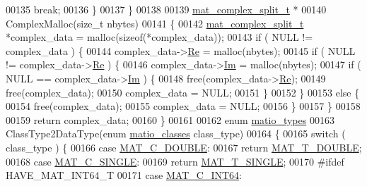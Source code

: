 \begin{DoxyCode}
{{{{{{{{{{{{{{{{00135             \textcolor{keywordflow}{break};
00136     \}
00137 \}
00138 
00139 \hyperlink{group___m_a_t_structmat__complex__split__t}{mat\_complex\_split\_t} *
00140 ComplexMalloc(\textcolor{keywordtype}{size\_t} nbytes)
00141 \{
00142     \hyperlink{group___m_a_t_structmat__complex__split__t}{mat\_complex\_split\_t} *complex\_data = malloc(\textcolor{keyword}{sizeof}(*complex\_data));
00143     \textcolor{keywordflow}{if} ( NULL != complex\_data ) \{
00144         complex\_data->\hyperlink{group___m_a_t_a484a93607508adac2bce53a0252e0325}{Re} = malloc(nbytes);
00145         \textcolor{keywordflow}{if} ( NULL != complex\_data->\hyperlink{group___m_a_t_a484a93607508adac2bce53a0252e0325}{Re} ) \{
00146             complex\_data->\hyperlink{group___m_a_t_a7182d10b0d3598415887376065440946}{Im} = malloc(nbytes);
00147             \textcolor{keywordflow}{if} ( NULL == complex\_data->\hyperlink{group___m_a_t_a7182d10b0d3598415887376065440946}{Im} ) \{
00148                 free(complex\_data->\hyperlink{group___m_a_t_a484a93607508adac2bce53a0252e0325}{Re});
00149                 free(complex\_data);
00150                 complex\_data = NULL;
00151             \}
00152         \}
00153         \textcolor{keywordflow}{else} \{
00154             free(complex\_data);
00155             complex\_data = NULL;
00156         \}
00157     \}
00158 
00159     \textcolor{keywordflow}{return} complex\_data;
00160 \}
00161 
00162 \textcolor{keyword}{enum} \hyperlink{group___m_a_t_gacf7b3b879282b7ab3a51190e49bf3453}{matio\_types}
00163 ClassType2DataType(\textcolor{keyword}{enum} \hyperlink{group___m_a_t_gad4d60ae7b709fc81bfd744fb4c857c40}{matio\_classes} class\_type)
00164 \{
00165     \textcolor{keywordflow}{switch} ( class\_type ) \{
00166         \textcolor{keywordflow}{case} \hyperlink{group___m_a_t_ggad4d60ae7b709fc81bfd744fb4c857c40a5d70e0862e5bdb7bd86bf7ba5948f307}{MAT\_C\_DOUBLE}:
00167             \textcolor{keywordflow}{return} \hyperlink{group___m_a_t_ggacf7b3b879282b7ab3a51190e49bf3453a31e721ecf7e188196f83c32838288797}{MAT\_T\_DOUBLE};
00168         \textcolor{keywordflow}{case} \hyperlink{group___m_a_t_ggad4d60ae7b709fc81bfd744fb4c857c40a2825631e26a961cbe0f79db50a39cea2}{MAT\_C\_SINGLE}:
00169             \textcolor{keywordflow}{return} \hyperlink{group___m_a_t_ggacf7b3b879282b7ab3a51190e49bf3453a3a3657d40e9212c923d9b9d03531b64c}{MAT\_T\_SINGLE};
00170 \textcolor{preprocessor}{#ifdef HAVE\_MAT\_INT64\_T}
00171         \textcolor{keywordflow}{case} \hyperlink{group___m_a_t_ggad4d60ae7b709fc81bfd744fb4c857c40a1ea83bcde49b35477494412973f82409}{MAT\_C\_INT64}:
}}}}}}}}}}}}}}}}
\end{DoxyCode}
